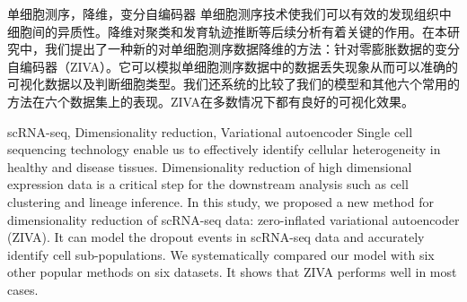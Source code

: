 \begin{中文摘要}{单细胞测序，降维，变分自编码器}
  单细胞测序技术使我们可以有效的发现组织中细胞间的异质性。降维对聚类和发育轨迹推断等后续分析有着关键的作用。在本研究中，我们提出了一种新的对单细胞测序数据降维的方法：针对零膨胀数据的变分自编码器（ZIVA）。它可以模拟单细胞测序数据中的数据丢失现象从而可以准确的可视化数据以及判断细胞类型。我们还系统的比较了我们的模型和其他六个常用的方法在六个数据集上的表现。ZIVA在多数情况下都有良好的可视化效果。
\end{中文摘要}

\begin{英文摘要}{scRNA-seq, Dimensionality reduction, Variational autoencoder}
  Single cell sequencing technology enable us to effectively identify cellular heterogeneity in healthy and disease tissues. Dimensionality reduction of high dimensional expression data is a critical step for the downstream analysis such as cell clustering and lineage inference. In this study, we proposed a new method for dimensionality reduction of scRNA-seq data: zero-inflated variational autoencoder (ZIVA). It can model the dropout events in scRNA-seq data and accurately identify cell sub-populations. We systematically compared our model with six other popular methods on six datasets. It shows that ZIVA performs well in most cases.
\end{英文摘要}
